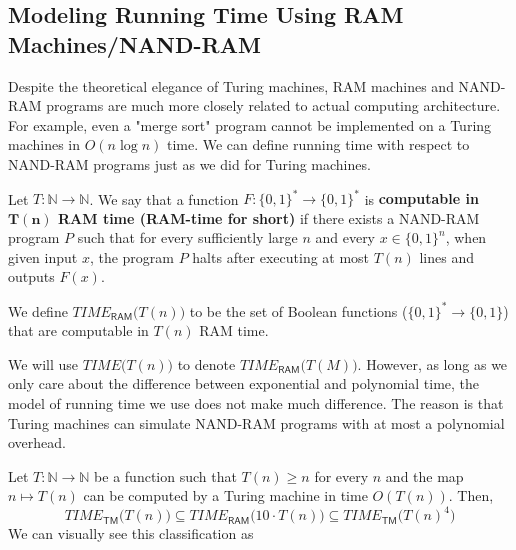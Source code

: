 \subsection{Modeling Running Time Using RAM Machines/NAND-RAM}

  Despite the theoretical elegance of Turing machines, RAM machines and NAND-RAM programs are much more closely related to actual computing architecture. For example, even a "merge sort" program cannot be implemented on a Turing machines in $O(n \log n)$ time. We can define running time with respect to NAND-RAM programs just as we did for Turing machines. 

  \begin{definition}
  Let $T: \mathbb{N} \longrightarrow \mathbb{N}$. We say that a function $F: \{0,1\}^* \longrightarrow \{0,1\}^*$ is \textbf{computable in $\mathbf{T(n)}$ RAM time (RAM-time for short)} if there exists a NAND-RAM program $P$ such that for every sufficiently large $n$ and every $x \in \{0,1\}^n$, when given input $x$, the program $P$ halts after executing at most $T(n)$ lines and outputs $F(x)$. 

  We define $TIME_{\mathsf{RAM}} \big(T(n)\big)$ to be the set of Boolean functions ($\{0,1\}^* \longrightarrow \{0,1\}$) that are computable in $T(n)$ RAM time. 
  \end{definition}

  We will use $TIME \big( T(n)\big)$ to denote $TIME_{\mathsf{RAM}} \big(T(M) \big)$. However, as long as we only care about the difference between exponential and polynomial time, the model of running time we use does not make much difference. The reason is that Turing machines can simulate NAND-RAM programs with at most a polynomial overhead. 

  \begin{theorem}
  Let $T: \mathbb{N} \longrightarrow \mathbb{N}$ be a function such that $T(n) \geq n$ for every $n$ and the map $n \mapsto T(n)$ can be computed by a Turing machine in time $O(T(n))$. Then, 
  \[TIME_{\mathsf{TM}}\big( T(n)\big) \subseteq TIME_{\mathsf{RAM}}\big( 10 \cdot T(n)\big) \subseteq TIME_{\mathsf{TM}} \big( T(n)^4\big)\]
  We can visually see this classification as 
  \begin{center}
  \end{center}
  \end{theorem}

